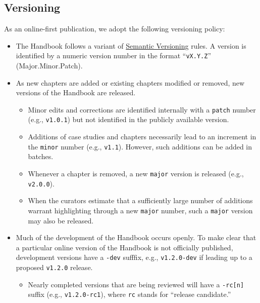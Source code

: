\documentclass[
]{WileySix}
\providecommand{\tightlist}{%
  \setlength{\itemsep}{0pt}\setlength{\parskip}{0pt}}
\begin{document}
\hypertarget{versioning}{%
\subsection*{Versioning}\label{versioning}}

As an online-first publication, we adopt the following versioning policy:

\begin{itemize}
\tightlist
\item
  The Handbook follows a variant of \href{https://semver.org/}{Semantic Versioning} rules. A version is identified by a numeric version number in the format ``\texttt{vX.Y.Z}'' (Major.Minor.Patch).
\item
  As new chapters are added or existing chapters modified or removed, new versions of the Handbook are released.

  \begin{itemize}
  \tightlist
  \item
    Minor edits and corrections are identified internally with a \texttt{patch} number (e.g., \texttt{v1.0.1}) but not identified in the publicly available version.
  \item
    Additions of case studies and chapters necessarily lead to an increment in the \texttt{minor} number (e.g., \texttt{v1.1}). However, such additions can be added in batches.
  \item
    Whenever a chapter is removed, a new \texttt{major} version is released (e.g., \texttt{v2.0.0}).
  \item
    When the curators estimate that a sufficiently large number of additions warrant highlighting through a new \texttt{major} number, such a \texttt{major} version may also be released.
  \end{itemize}
\item
  Much of the development of the Handbook occurs openly. To make clear that a particular online version of the Handbook is not officially published, development versions have a \texttt{-dev} sufffix, e.g., \texttt{v1.2.0-dev} if leading up to a proposed \texttt{v1.2.0} release.

  \begin{itemize}
  \tightlist
  \item
    Nearly completed versions that are being reviewed will have a \texttt{-rc{[}n{]}} suffix (e.g., \texttt{v1.2.0-rc1}), where \texttt{rc} stands for ``release candidate.''
  \end{itemize}
\end{itemize}
\end{document}
